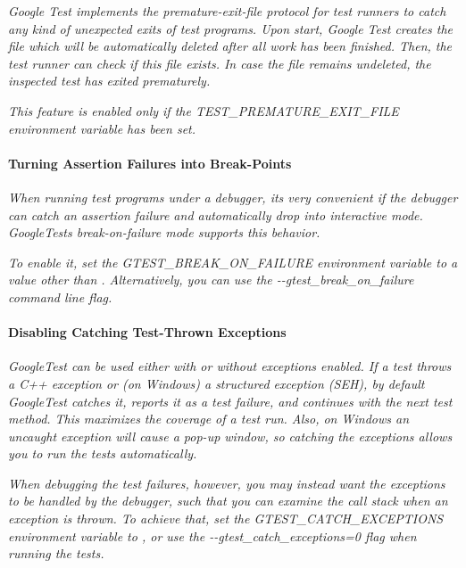 {\itshape }

{\itshape Google Test implements the {\itshape premature-\/exit-\/file} protocol for test runners to catch any kind of unexpected exits of test programs. Upon start, Google Test creates the file which will be automatically deleted after all work has been finished. Then, the test runner can check if this file exists. In case the file remains undeleted, the inspected test has exited prematurely.}

{\itshape This feature is enabled only if the {\ttfamily T\+E\+S\+T\+\_\+\+P\+R\+E\+M\+A\+T\+U\+R\+E\+\_\+\+E\+X\+I\+T\+\_\+\+F\+I\+LE} environment variable has been set.}

{\itshape \paragraph*{Turning Assertion Failures into Break-\/\+Points}}

{\itshape }

{\itshape When running test programs under a debugger, it\textquotesingle{}s very convenient if the debugger can catch an assertion failure and automatically drop into interactive mode. Google\+Test\textquotesingle{}s {\itshape break-\/on-\/failure} mode supports this behavior.}

{\itshape To enable it, set the {\ttfamily G\+T\+E\+S\+T\+\_\+\+B\+R\+E\+A\+K\+\_\+\+O\+N\+\_\+\+F\+A\+I\+L\+U\+RE} environment variable to a value other than {}. Alternatively, you can use the {\ttfamily -\/-\/gtest\+\_\+break\+\_\+on\+\_\+failure} command line flag.}

{\itshape \paragraph*{Disabling Catching Test-\/\+Thrown Exceptions}}

{\itshape }

{\itshape Google\+Test can be used either with or without exceptions enabled. If a test throws a C++ exception or (on Windows) a structured exception (S\+EH), by default Google\+Test catches it, reports it as a test failure, and continues with the next test method. This maximizes the coverage of a test run. Also, on Windows an uncaught exception will cause a pop-\/up window, so catching the exceptions allows you to run the tests automatically.}

{\itshape When debugging the test failures, however, you may instead want the exceptions to be handled by the debugger, such that you can examine the call stack when an exception is thrown. To achieve that, set the {\ttfamily G\+T\+E\+S\+T\+\_\+\+C\+A\+T\+C\+H\+\_\+\+E\+X\+C\+E\+P\+T\+I\+O\+NS} environment variable to {}, or use the {\ttfamily -\/-\/gtest\+\_\+catch\+\_\+exceptions=0} flag when running the tests.}

